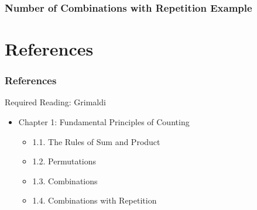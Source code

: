 \documentclass[dvipsnames]{beamer}
\begin{document}
\begin{frame}
  \frametitle{Number of Combinations with Repetition Example}

\end{frame}

\section*{References}

\begin{frame}
  \frametitle{References}
  \begin{block}{Required Reading: Grimaldi}
    \begin{itemize}
      \item Chapter 1: Fundamental Principles of Counting
      \begin{itemize}
        \item 1.1. \alert{The Rules of Sum and Product}
        \item 1.2. \alert{Permutations}
        \item 1.3. \alert{Combinations}
        \item 1.4. \alert{Combinations with Repetition}
      \end{itemize}
    \end{itemize}
  \end{block}
\end{frame}
\end{document}
